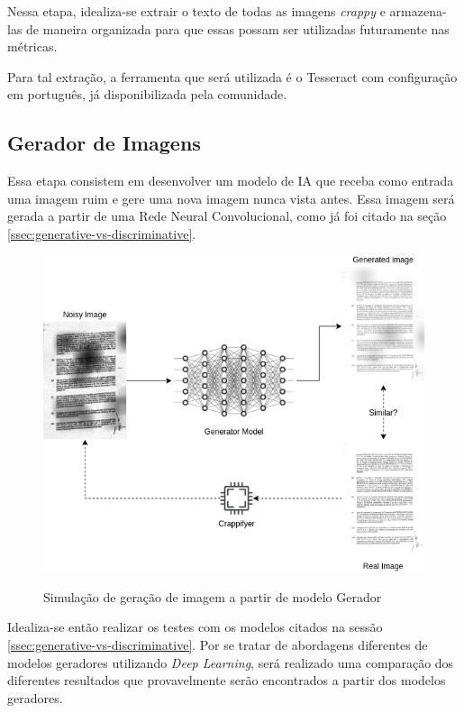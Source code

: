 Nessa etapa, idealiza-se extrair o texto de todas as imagens \textit{crappy} e armazena-las de maneira organizada para que essas possam ser utilizadas futuramente nas métricas.

Para tal extração, a ferramenta que será utilizada é o Tesseract com configuração em português, já disponibilizada pela comunidade.


\subsection{Gerador de Imagens}

Essa etapa consistem em desenvolver um modelo de IA que receba como entrada uma imagem ruim e gere uma nova imagem nunca vista antes. Essa imagem será gerada a partir de uma Rede Neural Convolucional, como já foi citado na seção \ref{ssec:generative-vs-discriminative}.

\begin{figure}[H]
  \centering
  \caption{Simulação de geração de imagem a partir de modelo Gerador}
  \includegraphics[scale=0.6]{figuras/image-generation.png}
  \label{fig:image-generation}
\end{figure}

Idealiza-se então realizar os testes com os modelos citados na sessão \ref{ssec:generative-vs-discriminative}. Por se tratar de abordagens diferentes de modelos geradores utilizando \textit{Deep Learning}, será realizado uma comparação dos diferentes resultados que provavelmente serão encontrados a partir dos modelos geradores.

